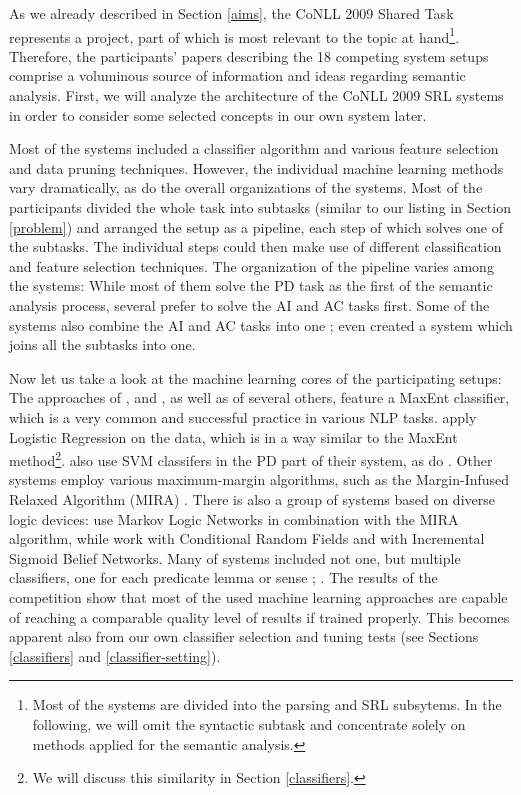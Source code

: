 \documentclass[12pt,notitlepage]{report}
\begin{document}
As we already described in Section \ref{aims}, the CoNLL 2009 Shared Task represents a project, part of which is most relevant to the topic at hand\footnote{Most of the systems are divided into the parsing and SRL subsytems. In the following, we will omit the syntactic subtask and concentrate solely on methods applied for the semantic analysis.}. Therefore, the participants' papers describing the 18 competing system setups comprise a voluminous source of information and ideas regarding semantic analysis. First, we will analyze the architecture of the CoNLL 2009 SRL systems in order to consider some selected concepts in our own system later. 

Most of the systems included a classifier algorithm and various feature selection and data pruning techniques. However, the individual machine learning methods vary dramatically, as do the overall organizations of the systems. Most of the participants divided the whole task into subtasks (similar to our listing in Section \ref{problem}) and arranged the setup as a pipeline, each step of which solves one of the subtasks. The individual steps could then make use of different classification and feature selection techniques. The organization of the pipeline varies among the systems: While most of them solve the PD task as the first of the semantic analysis process, several \citep{bohnet09,zhao09} prefer to solve the AI and AC tasks first. Some of the systems also combine the AI and AC tasks into one \citep{che09,nugues09}; \citet{meza-ruiz09} even created a system which joins all the subtasks into one. 

Now let us take a look at the machine learning cores of the participating setups: The approaches of \citet{zhao09}, \citet{che09} and \citet{chen09}, as well as of several others, feature a MaxEnt classifier, which is a very common and successful practice in various NLP tasks. \citet{nugues09} apply Logistic Regression on the data, which is in a way similar to the MaxEnt method\footnote{We will discuss this similarity in Section \ref{classifiers}.}. \citet{che09} also use SVM classifers in the PD part of their system, as do \citet{tackstrom09}. Other systems \citep{bohnet09,asahara09} employ various maximum-margin algorithms, such as the Margin-Infused Relaxed Algorithm (MIRA) \citep{crammer03}. There is also a group of systems based on diverse logic devices: \citet{meza-ruiz09} use Markov Logic Networks in combination with the MIRA algorithm, while \citet{moreau09} work with Conditional Random Fields and \citet{merlo09} with Incremental Sigmoid Belief Networks. Many of systems included not one, but multiple classifiers, one for each predicate lemma or sense \citep{che09}; \citep{nugues09}. The results of the competition show that most of the used machine learning approaches are capable of reaching a comparable quality level of results if trained properly. This becomes apparent also from our own classifier selection and tuning tests (see Sections \ref{classifiers} and \ref{classifier-setting}).
\end{document}
